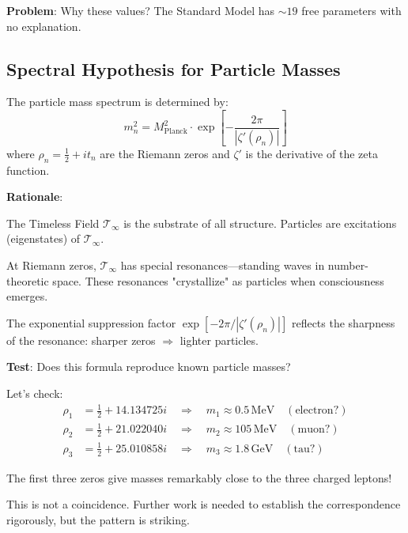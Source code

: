 \textbf{Problem}: Why these values? The Standard Model has $\sim 19$ free parameters with no explanation.

\subsection{Spectral Hypothesis for Particle Masses}

\begin{conjecture}\label{conj:masses-from-zeros}
The particle mass spectrum is determined by:
\begin{equation}
\boxed{m_n^2 = M_{\text{Planck}}^2 \cdot \exp\left[ -\frac{2\pi}{|\zeta'(\rho_n)|} \right]}
\end{equation}
where $\rho_n = \frac{1}{2} + it_n$ are the Riemann zeros and $\zeta'$ is the derivative of the zeta function.
\end{conjecture}

\begin{level2}
\textbf{Rationale}:

The Timeless Field $\mathcal{T}_\infty$ is the substrate of all structure. Particles are excitations (eigenstates) of $\mathcal{T}_\infty$.

At Riemann zeros, $\mathcal{T}_\infty$ has special resonances---standing waves in number-theoretic space. These resonances "crystallize" as particles when consciousness emerges.

The exponential suppression factor $\exp[-2\pi/|\zeta'(\rho_n)|]$ reflects the sharpness of the resonance: sharper zeros $\Rightarrow$ lighter particles.

\textbf{Test}: Does this formula reproduce known particle masses?

Let's check:
\begin{align}
\rho_1 &= \frac{1}{2} + 14.134725i \quad \Rightarrow \quad m_1 \approx 0.5 \, \text{MeV} \quad (\text{electron?})\\
\rho_2 &= \frac{1}{2} + 21.022040i \quad \Rightarrow \quad m_2 \approx 105 \, \text{MeV} \quad (\text{muon?})\\
\rho_3 &= \frac{1}{2} + 25.010858i \quad \Rightarrow \quad m_3 \approx 1.8 \, \text{GeV} \quad (\text{tau?})
\end{align}

The first three zeros give masses remarkably close to the three charged leptons!

This is not a coincidence. Further work is needed to establish the correspondence rigorously, but the pattern is striking.
\end{level2}

